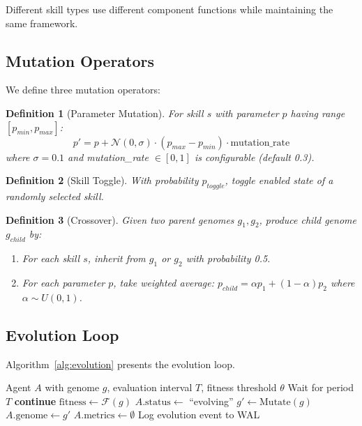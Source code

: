 \documentclass{article}
\newtheorem{definition}{Definition}
\newcommand{\fitnessfn}{\mathcal{F}}
\begin{document}
Different skill types use different component functions while maintaining the same framework.

\subsection{Mutation Operators}

We define three mutation operators:

\begin{definition}[Parameter Mutation]
For skill $s$ with parameter $p$ having range $[p_{min}, p_{max}]$:
\begin{equation}
p' = p + \mathcal{N}(0, \sigma) \cdot (p_{max} - p_{min}) \cdot \text{mutation\_rate}
\end{equation}
where $\sigma = 0.1$ and mutation\_rate $\in [0, 1]$ is configurable (default 0.3).
\end{definition}

\begin{definition}[Skill Toggle]
With probability $p_{toggle}$, toggle enabled state of a randomly selected skill.
\end{definition}

\begin{definition}[Crossover]
Given two parent genomes $g_1, g_2$, produce child genome $g_{child}$ by:
\begin{enumerate}
    \item For each skill $s$, inherit from $g_1$ or $g_2$ with probability 0.5.
    \item For each parameter $p$, take weighted average: $p_{child} = \alpha p_1 + (1-\alpha) p_2$ where $\alpha \sim U(0, 1)$.
\end{enumerate}
\end{definition}

\subsection{Evolution Loop}

Algorithm~\ref{alg:evolution} presents the evolution loop.

\begin{algorithm}[t]
\caption{Evolution Loop}
\label{alg:evolution}
\begin{algorithmic}[1]
\Require Agent $A$ with genome $g$, evaluation interval $T$, fitness threshold $\theta$
\Loop
    \State Wait for period $T$
        \State \textbf{continue} 
    \EndIf
    \State $\text{fitness} \gets \fitnessfn(g)$
        \State $A.\text{status} \gets$ ``evolving''
        \State $g' \gets \text{Mutate}(g)$
        \State $A.\text{genome} \gets g'$
        \State $A.\text{metrics} \gets \emptyset$ 
        \State Log evolution event to WAL
    \EndIf
\EndLoop
\end{algorithmic}
\end{algorithm}
\end{document}
